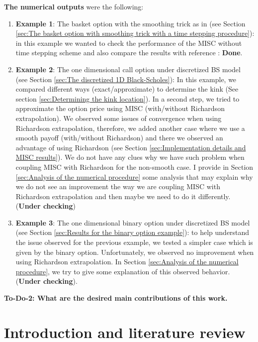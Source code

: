 \documentclass[11pt]{article}
\begin{document}
\textbf{The numerical outputs} were the following:
\begin{enumerate}
	\item \textbf{Example 1}: The basket option with the smoothing trick as in \cite{bayersmoothing} (see Section \ref{sec:The basket option with smoothing trick with a time stepping procedure}): in this example we wanted to check the performance of the MISC without time stepping scheme and also compare the results with reference \cite{bayersmoothing}: \textbf{Done}.
	
		\item \textbf{Example 2}: The one dimensional call option under discretized BS model (see Section \ref{sec:The discretized 1D Black-Scholes}): In this example, we compared different ways (exact/approximate) to determine the kink (See section \ref{sec:Determining the kink location}). In a second step, we tried to approximate the option price using MISC (with/without Richardson extrapolation). We observed some issues of convergence when using Richardson extrapolation, therefore, we added another case where we use a smooth payoff (with/without Richardson) and there we observed an advantage of using Richardson (see Section \ref{sec:Implementation details and  MISC results}). We do not have any clues why we have such problem when coupling MISC with Richardson for the non-smooth case.  I provide in Section \ref{sec:Analysis of the numerical procedure} some analysis that may explain why we do not see an improvement the way we are coupling MISC with Richardson extrapolation and then maybe we need to do it differently. (\textbf{Under checking})
		\item 	 \textbf{Example 3}: The one dimensional binary option under discretized BS model (see Section \ref{sec:Results for the binary option example}): to help understand the issue observed for the previous example, we tested a simpler case which is given by the binary option. Unfortunately, we observed no improvement when using Richardson extrapolation. In Section \ref{sec:Analysis of the numerical procedure}, we try to give some explanation of this observed behavior. (\textbf{Under checking}).
\end{enumerate}

\textbf{To-Do-2: What are the desired main contributions of this work. }
\section{Introduction and literature review}
\end{document}
